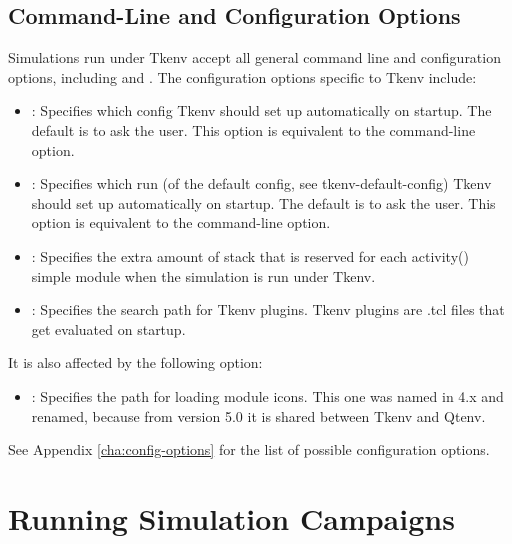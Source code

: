 \subsection{Command-Line and Configuration Options}
\label{sec:run-sim:tkenv-options}

Simulations run under Tkenv accept all general command line
and configuration options, including  and . 
The configuration options specific to Tkenv include:

\begin{itemize}
  \item {}:
    Specifies which config Tkenv should set up automatically on startup. The
    default is to ask the user. This option is equivalent to the 
    command-line option.

  \item {}: Specifies which run (of the default
    config, see tkenv-default-config) Tkenv should set up automatically on startup.
    The default is to ask the user. This option is equivalent to the 
    command-line option.

  \item {}:
    Specifies the extra amount of stack that is reserved for each activity()
    simple module when the simulation is run under Tkenv.

  \item {}:
    Specifies the search path for Tkenv plugins. Tkenv plugins are .tcl files
    that get evaluated on startup.
\end{itemize}

It is also affected by the following option:

\begin{itemize}
  \item {}: Specifies the path for loading module icons.
    This one was named  in {\opp} 4.x and renamed,
    because from version 5.0 it is shared between Tkenv and Qtenv.
\end{itemize}

See Appendix \ref{cha:config-options} for the list of possible configuration
options.


\section{Running Simulation Campaigns}
\label{sec:run-sim:simulation-campaigns}

